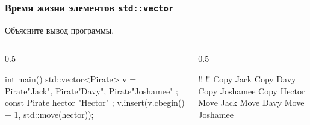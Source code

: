 \documentclass[compress, 8pt, aspectratio=169]{beamer}
\begin{document}
  \begin{frame}[fragile]

    \frametitle{Время жизни элементов \texttt{std::vector}}

    \begin{task}
      Объясните вывод программы.
    \end{task}

    \begin{columns}[T]

      \begin{column}{0.5\textwidth}

        \begin{mycppinplacelisting}
int main() {
    std::vector<Pirate> v = {
        Pirate{"Jack"},
        Pirate{"Davy"},
        Pirate{"Joshamee"}
    };
    const Pirate hector
        { "Hector" };
    v.insert(v.cbegin() + 1,
         std::move(hector));
}
        \end{mycppinplacelisting}

      \end{column}

      \begin{column}{0.5\textwidth}

        \begin{terminalwindow}
!!
!!
Copy Jack
Copy Davy
Copy Joshamee
Copy Hector
Move Jack
Move Davy
Move Joshamee
        \end{terminalwindow}

      \end{column}

    \end{columns}

  \end{frame}
\end{document}
